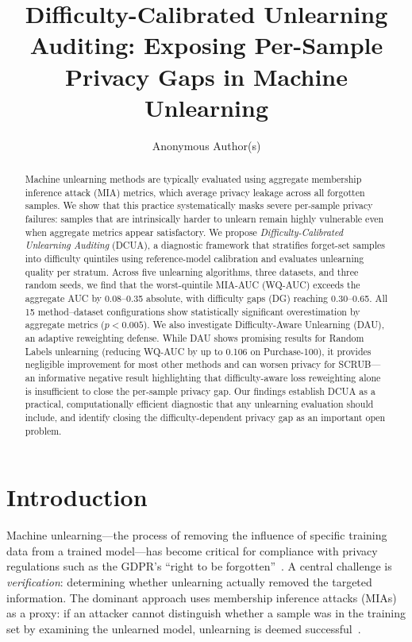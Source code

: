\documentclass{article}
\title{Difficulty-Calibrated Unlearning Auditing: Exposing Per-Sample Privacy Gaps in Machine Unlearning}
\author{
  Anonymous Author(s)
}
\begin{document}
\maketitle

\begin{abstract}
Machine unlearning methods are typically evaluated using aggregate membership inference attack (MIA) metrics, which average privacy leakage across all forgotten samples.
We show that this practice systematically masks severe per-sample privacy failures: samples that are intrinsically harder to unlearn remain highly vulnerable even when aggregate metrics appear satisfactory.
We propose \emph{Difficulty-Calibrated Unlearning Auditing} (DCUA), a diagnostic framework that stratifies forget-set samples into difficulty quintiles using reference-model calibration and evaluates unlearning quality per stratum.
Across five unlearning algorithms, three datasets, and three random seeds, we find that the worst-quintile MIA-AUC (WQ-AUC) exceeds the aggregate AUC by 0.08--0.35 absolute, with difficulty gaps (DG) reaching 0.30--0.65.
All 15 method--dataset configurations show statistically significant overestimation by aggregate metrics ($p < 0.005$).
We also investigate Difficulty-Aware Unlearning (DAU), an adaptive reweighting defense.
While DAU shows promising results for Random Labels unlearning (reducing WQ-AUC by up to 0.106 on Purchase-100), it provides negligible improvement for most other methods and can worsen privacy for SCRUB---an informative negative result highlighting that difficulty-aware loss reweighting alone is insufficient to close the per-sample privacy gap.
Our findings establish DCUA as a practical, computationally efficient diagnostic that any unlearning evaluation should include, and identify closing the difficulty-dependent privacy gap as an important open problem.
\end{abstract}

\section{Introduction}

Machine unlearning---the process of removing the influence of specific training data from a trained model---has become critical for compliance with privacy regulations such as the GDPR's ``right to be forgotten''~\citep{bourtoule2021machine}.
A central challenge is \emph{verification}: determining whether unlearning actually removed the targeted information.
The dominant approach uses membership inference attacks (MIAs) as a proxy: if an attacker cannot distinguish whether a sample was in the training set by examining the unlearned model, unlearning is deemed successful~\citep{chen2021machine,kurmanji2023towards}.
\end{document}
